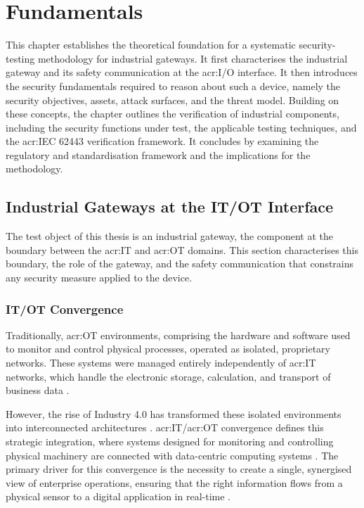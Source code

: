 \chapter{Fundamentals} 
\label{chap:fundamentals} 

This chapter establishes the theoretical foundation for a systematic security-testing methodology for industrial gateways. It first characterises the industrial gateway and its safety communication at the \gls{acr:I/O} interface. It then introduces the security fundamentals required to reason about such a device, namely the security objectives, assets, attack surfaces, and the threat model. Building on these concepts, the chapter outlines the verification of industrial components, including the security functions under test, the applicable testing techniques, and the \gls{acr:IEC} 62443 verification framework. It concludes by examining the regulatory and standardisation framework and the implications for the methodology.

\section{Industrial Gateways at the IT/OT Interface} 
\label{sec:industrial_gateways} 

The test object of this thesis is an industrial gateway, the component at the boundary between the \gls{acr:IT} and \gls{acr:OT} domains. This section characterises this boundary, the role of the gateway, and the safety communication that constrains any security measure applied to the device.

\subsection{IT/OT Convergence} 
\label{subsec:it_ot_interfaces}

Traditionally, \gls{acr:OT} environments, comprising the hardware and software used to monitor and control physical processes, operated as isolated, proprietary networks. These systems were managed entirely independently of \gls{acr:IT} networks, which handle the electronic storage, calculation, and transport of business data \cite[p. 2]{EHIE2020103166} \cite[p. 199]{8586807}. 

However, the rise of Industry 4.0 has transformed these isolated environments into interconnected architectures \cite[pp. 14]{Babel2024}. \gls{acr:IT}/\gls{acr:OT} convergence defines this strategic integration, where systems designed for monitoring and controlling physical machinery are connected with data-centric computing systems \cite[p. 2]{EHIE2020103166}. The primary driver for this convergence is the necessity to create a single, synergised view of enterprise operations, ensuring that the right information flows from a physical sensor to a digital application in real-time \cite[p. 4]{EHIE2020103166}.

